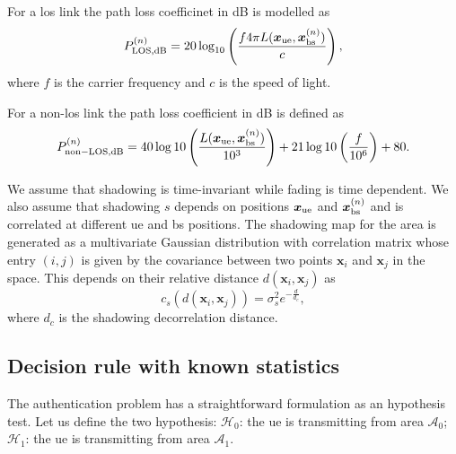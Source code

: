 \documentclass[draftcls,onecolumn,12pt]{IEEEtran}
\begin{document}
For a \ac{los} link the path loss coefficinet in dB is modelled as
\begin{equation}\label{eq:los}
    P_{\rm LOS,dB}^{(n)} = 20\log_{10}\left(\frac{f 4\pi L(\bm{x}_{\rm ue},\bm{x}_{\rm bs}^{(n)})}{c}\right),
\end{equation}
where $f$ is the carrier frequency and $c$ is the speed of light.

For a  non-\ac{los} link the path loss coefficient in dB is defined as
\begin{equation}
    P_{\rm non-LOS,dB}^{(n)} = 40\log10\left (\frac{L(\bm{x}_{\rm ue},\bm{x}_{\rm bs}^{(n)})}{10^3}\right ) + 21\log10\left(\frac{f}{10^6}\right) + 80.
\end{equation}

We assume that shadowing is time-invariant while fading is time dependent. We also assume that shadowing $s$ depends on positions $\bm{x}_{\rm ue}$ and $\bm{x}_{\rm bs}^{(n)}$ and is correlated at different \ac{ue} and \ac{bs} positions. The shadowing map for the area is generated as a multivariate Gaussian distribution with correlation matrix whose entry $(i,j)$ is given by the covariance between two points $\bm{x}_i$ and $\bm{x}_j$ in the space. This depends on their relative distance $d(\bm{x}_i,\bm{x}_j)$ as
\begin{equation}\label{eq: coor mat}
    c_s\left(d(\bm{x}_i,\bm{x}_j)\right) = \sigma_s^2e^{-\frac{d}{d_c}},
\end{equation}
where $d_c$ is the shadowing decorrelation distance. 

\subsection{Decision rule with known statistics}\label{sec:auth}
The authentication problem has a straightforward formulation as an hypothesis test. Let us define the two hypothesis: $\mathcal{H}_0$: the \ac{ue} is transmitting from area $\mathcal{A}_0$; $\mathcal{H}_1$: the \ac{ue} is transmitting from area $\mathcal{A}_1$.
\end{document}
